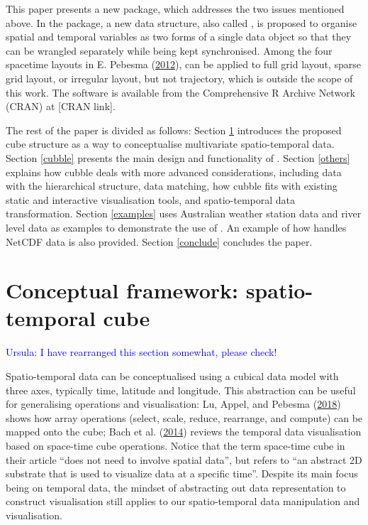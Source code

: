 \documentclass{article}
\begin{document}
This paper presents a new  package,  which addresses the two issues mentioned above. In the package, a new data structure, also called , is proposed to organise spatial and temporal variables as two forms of a single data object so that they can be wrangled separately while being kept synchronised. Among the four spacetime layouts in E. Pebesma (\protect\hyperlink{ref-spacetime}{2012}),  can be applied to full grid layout, sparse grid layout, or irregular layout, but not trajectory, which is outside the scope of this work. The software is available from the Comprehensive R Archive Network (CRAN) at {[}CRAN link{]}.

The rest of the paper is divided as follows: Section \ref{cube} introduces the proposed cube structure as a way to conceptualise multivariate spatio-temporal data. Section \ref{cubble} presents the main design and functionality of . Section \ref{others} explains how cubble deals with more advanced considerations, including data with the hierarchical structure, data matching, how cubble fits with existing static and interactive visualisation tools, and spatio-temporal data transformation. Section \ref{examples} uses Australian weather station data and river level data as examples to demonstrate the use of . An example of how  handles NetCDF data is also provided. Section \ref{conclude} concludes the paper.

\hypertarget{cube}{%
\section{Conceptual framework: spatio-temporal cube}\label{cube}}

\textcolor{blue}{Ursula: I have rearranged this section somewhat, please check!}

Spatio-temporal data can be conceptualised using a cubical data model with three axes, typically time, latitude and longitude. This abstraction can be useful for generalising operations and visualisation: Lu, Appel, and Pebesma (\protect\hyperlink{ref-lu_multidimensional_2018}{2018}) shows how array operations (select, scale, reduce, rearrange, and compute) can be mapped onto the cube; Bach et al. (\protect\hyperlink{ref-bach_review_2014}{2014}) reviews the temporal data visualisation based on space-time cube operations. Notice that the term space-time cube in their article ``does not need to involve spatial data'', but refers to ``an abstract 2D substrate that is used to visualize data at a specific time''. Despite its main focus being on temporal data, the mindset of abstracting out data representation to construct visualisation still applies to our spatio-temporal data manipulation and visualisation.
\end{document}

